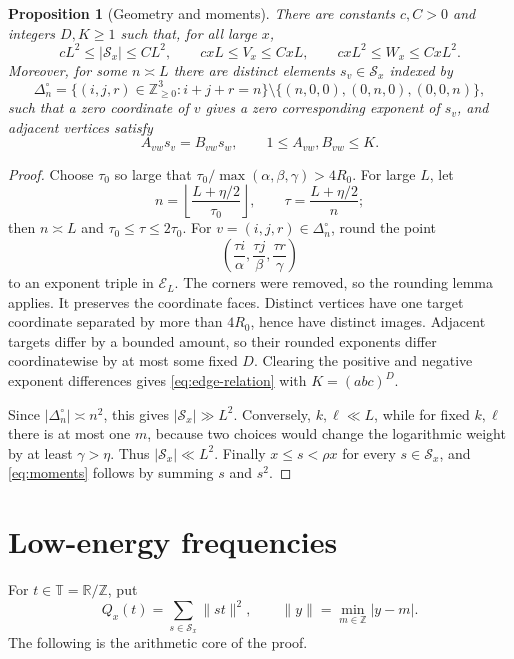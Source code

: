 \documentclass[10pt,reqno]{amsart}
\newtheorem{proposition}[theorem]{Proposition}
\newcommand{\Nzero}{\mathbb Z_{\ge 0}}
\newcommand{\Z}{\mathbb Z}
\newcommand{\R}{\mathbb R}
\newcommand{\T}{\mathbb T}
\newcommand{\Sx}{\mathcal S_x}
\newcommand{\Eset}{\mathcal E}
\newcommand{\distz}[1]{\lVert #1\rVert}
\begin{document}
\begin{proposition}[Geometry and moments]\label{prop:grid}
There are constants $c,C>0$ and integers $D,K\ge1$ such that, for all large
$x$,
\begin{equation}\label{eq:moments}
 cL^2\le |\Sx|\le CL^2,
 \qquad c xL\le V_x\le CxL,
 \qquad c xL^2\le W_x\le CxL^2.
\end{equation}
Moreover, for some $n\asymp L$ there are distinct elements $s_v\in\Sx$
indexed by
\[
 \Delta_n^\circ=\{(i,j,r)\in\Nzero^3:i+j+r=n\}
 \setminus\{(n,0,0),(0,n,0),(0,0,n)\},
\]
such that a zero coordinate of $v$ gives a zero corresponding exponent of
$s_v$, and adjacent vertices satisfy
\begin{equation}\label{eq:edge-relation}
 A_{vw}s_v=B_{vw}s_w,
 \qquad 1\le A_{vw},B_{vw}\le K.
\end{equation}
\end{proposition}

\begin{proof}
Choose $\tau_0$ so large that
$\tau_0/\max(\alpha,\beta,\gamma)>4R_0$.  For large $L$, let
\[
 n=\left\lfloor\frac{L+\eta/2}{\tau_0}\right\rfloor,
 \qquad \tau=\frac{L+\eta/2}{n};
\]
then $n\asymp L$ and $\tau_0\le\tau\le2\tau_0$.  For
$v=(i,j,r)\in\Delta_n^\circ$, round the point
\[
 \left(\frac{\tau i}{\alpha},
       \frac{\tau j}{\beta},
       \frac{\tau r}{\gamma}\right)
\]
to an exponent triple in $\Eset_L$.  The corners were removed, so the rounding
lemma applies.  It preserves the coordinate faces.  Distinct vertices have
one target coordinate separated by more than $4R_0$, hence have distinct
images.  Adjacent targets differ by a bounded amount, so their rounded
exponents differ coordinatewise by at most some fixed $D$.  Clearing the
positive and negative exponent differences gives \eqref{eq:edge-relation} with
$K=(abc)^D$.

Since $|\Delta_n^\circ|\asymp n^2$, this gives $|\Sx|\gg L^2$.  Conversely,
$k,\ell\ll L$, while for fixed $k,\ell$ there is at most one $m$, because two
choices would change the logarithmic weight by at least $\gamma>\eta$.
Thus $|\Sx|\ll L^2$.  Finally $x\le s<\rho x$ for every $s\in\Sx$, and
\eqref{eq:moments} follows by summing $s$ and $s^2$.
\end{proof}

\section{Low-energy frequencies}

For $t\in\T=\R/\Z$, put
\[
 Q_x(t)=\sum_{s\in\Sx}\distz{st}^{2},
 \qquad \distz y=\min_{m\in\Z}|y-m|.
\]
The following is the arithmetic core of the proof.
\end{document}
